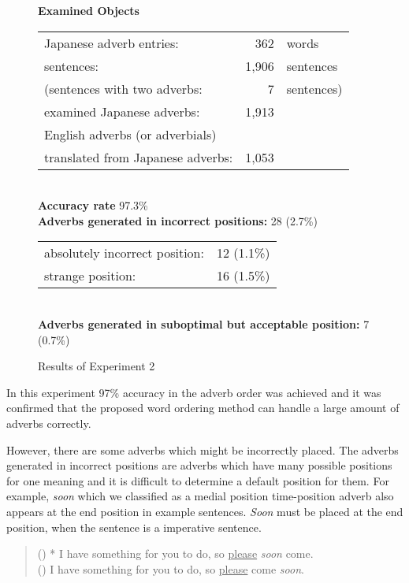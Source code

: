 \begin{singlespace}
\begin{figure}[htb]
    \leavevmode
    \small    
    {\bf Examined Objects} \\
    \begin{tabular}{lrl}
    Japanese adverb entries:          &       362 & words \\
    sentences:                        &     1,906 & sentences \\
    (sentences with two adverbs:      &         7 & sentences) \\
    examined Japanese adverbs:        &     1,913 & \\
    English adverbs (or adverbials)   &           &            \\
    translated from Japanese adverbs: &     1,053 & 
    \end{tabular} \\
    {\bf Accuracy rate}  97.3\% \\
    {\bf Adverbs generated in incorrect positions:}  28 (2.7\%) \\
    \begin{tabular}{lr}
    absolutely incorrect position: & 12 (1.1\%) \\
    strange position\footnotemark:
                                   & 16 (1.5\%)
    \end{tabular}\\
    {\bf Adverbs generated in suboptimal but acceptable position:} 7 (0.7\%)
    \caption{Results of Experiment 2}
    \vspace*{3mm}
    \label{fig:result2}
\end{figure}
\end{singlespace}

In this experiment 97\% accuracy in the adverb order was achieved and
it was confirmed that the proposed word ordering method can handle a
large amount of adverbs correctly. 

However, there are some adverbs which might be incorrectly placed. 
The adverbs generated\mbox{} in incorrect positions are adverbs which  
have many possible positions for one meaning
and it is difficult to determine a default position for them.
For example, {\em soon} which we classified as a medial position 
time-position adverb also appears at the end position in example sentences. 
{\em Soon} must be placed at the end position, when the sentence 
is a imperative sentence.  

\begin{singlespace}
\begin{quote}
 \small
 ()
 * I have something for you to do, so \underline{please} {\em soon} come. \\
 ()
 I have something for you to do, so \underline{please} come {\em soon}.
\end{quote}
\end{singlespace}

